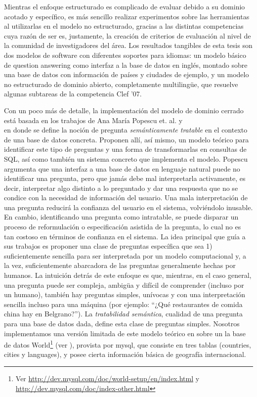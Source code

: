 Mientras el enfoque estructurado es complicado de evaluar debido a su dominio acotado y específico, es más sencillo realizar experimentos sobre las herramientas al utilizarlas en el modelo no estructurado, gracias a las distintas competencias cuya razón de ser es, justamente, la creación de criterios de evaluación al nivel de la comunidad de investigadores del área. Los resultados tangibles de esta tesis son dos modelos de software con diferentes soportes para idiomas: un modelo básico de question answering como interfaz a la base de datos en inglés, montado sobre una base de datos con información de países y ciudades de ejemplo, y un modelo no estructurado de dominio abierto, completamente multilingüe, que resuelve algunas subtareas de la competencia Clef '07.


Con un poco más de detalle, la implementación del modelo de dominio cerrado está basada en los trabajos de Ana María Popescu et. al.  \cite{QADB1} y \\
\cite{QADB2} en donde se define la noción de pregunta \textit{semánticamente tratable} en el contexto de una base de datos concreta. Proponen allí, así mismo, un modelo teórico para identificar este tipo de preguntas y una forma de transformarlas en consultas de SQL, así como también un sistema concreto que implementa el modelo. Popescu argumenta que una interfaz a una base de datos en lenguaje natural puede no identificar una pregunta, pero que jamás debe mal interpretarla activamente, es decir, interpretar algo distinto a lo preguntado y dar una respuesta que no se condice con la necesidad de información del usuario. Una mala interpretación de una pregunta reducirá la confianza del usuario en el sistema, volviéndolo inusable. En cambio, identificando una pregunta como intratable, se puede disparar un proceso de reformulación o especificación asistida de la pregunta, lo cual no es tan costoso en términos de confianza en el sistema. La idea principal que guía a sus trabajos es proponer una clase de preguntas específica que sea 1) suficientemente sencilla para ser interpretada por un modelo computacional y, a la vez, suficientemente abarcadora de las preguntas generalmente hechas por humanos. La intuición detrás de este enfoque es que, mientras, en el caso general, una pregunta puede ser compleja, ambigüa y difícil de comprender (incluso por un humano), también hay preguntas simples, unívocas y con una interpretación sencilla incluso para una máquina (por ejemplo: ``¿Qué restaurantes de comida china hay en Belgrano?''). La \textit{tratabilidad semántica}, cualidad de una pregunta para una base de datos dada, define esta clase de preguntas simples. Nosotros implementamos una versión limitada de este modelo teórico en  sobre un la base de datos World\footnote{Ver \url{http://dev.mysql.com/doc/world-setup/en/index.html} y \url{http://dev.mysql.com/doc/index-other.html}} (ver ), provista por mysql, que consiste en tres tablas (countries, cities y languages), y posee cierta información básica de geografía internacional.

